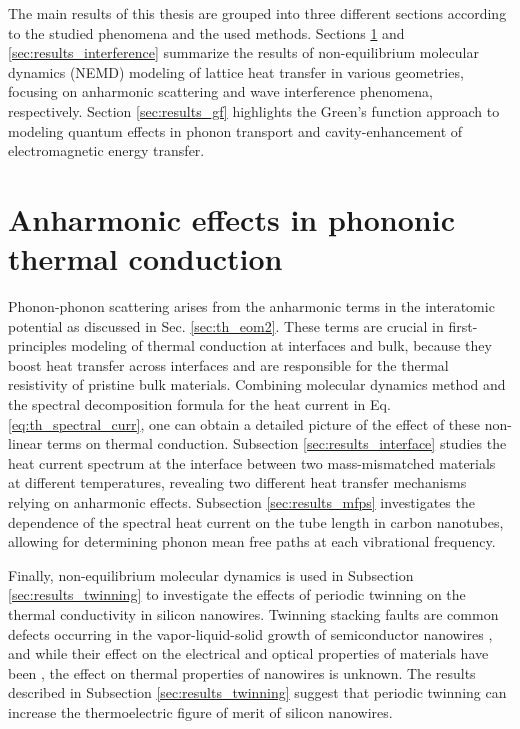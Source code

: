 
\label{chap:results}

The main results of this thesis are grouped into three different sections according to the studied phenomena and the used methods. Sections \ref{sec:results_anharm} and \ref{sec:results_interference} summarize the results of non-equilibrium molecular dynamics (NEMD) modeling of lattice heat transfer in various geometries, focusing on anharmonic scattering and wave interference phenomena, respectively. Section \ref{sec:results_gf} highlights the Green's function approach to modeling quantum effects in phonon transport and cavity-enhancement of electromagnetic energy transfer.

\section{Anharmonic effects in phononic thermal conduction}
\label{sec:results_anharm}

Phonon-phonon scattering arises from the anharmonic terms in the interatomic potential as discussed in Sec. \ref{sec:th_eom2}. These terms are crucial in first-principles modeling of thermal conduction at interfaces and bulk, because they boost heat transfer across interfaces \cite{lyeo06} and are responsible for the thermal resistivity of pristine bulk materials. Combining molecular dynamics method and the spectral decomposition formula for the heat current in Eq. \eqref{eq:th_spectral_curr}, one can obtain a detailed picture of the effect of these non-linear terms on thermal conduction. Subsection \ref{sec:results_interface} studies the heat current spectrum at the interface between two mass-mismatched materials at different temperatures, revealing two different heat transfer mechanisms relying on anharmonic effects. Subsection \ref{sec:results_mfps} investigates the dependence of the spectral heat current on the tube length in carbon nanotubes, allowing for determining phonon mean free paths at each vibrational frequency. 

Finally, non-equilibrium molecular dynamics is used in Subsection \ref{sec:results_twinning} to investigate the effects of periodic twinning on the thermal conductivity in silicon nanowires. Twinning stacking faults are common defects occurring in the vapor-liquid-solid growth of semiconductor nanowires \cite{johansson06,xiong06,davidson07,algra08}, and while their effect on the electrical \cite{ikonic93b} and optical \cite{ikonic95} properties of materials have been , the effect on thermal properties of nanowires is unknown. The results described in Subsection \ref{sec:results_twinning} suggest that periodic twinning can increase the thermoelectric figure of merit of silicon nanowires. 

